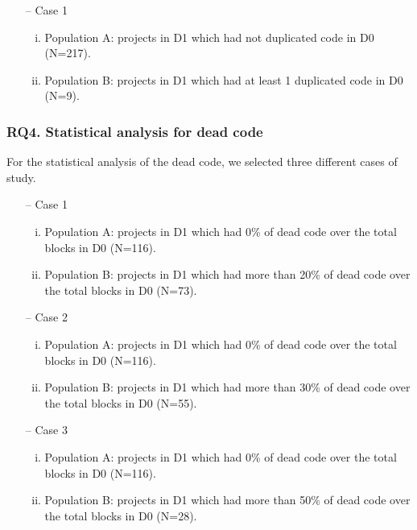 \begin{itemize}
    \item[--] Case 1
    \begin{enumerate}[(i)]
        \item Population A: projects in D1 which had not duplicated code in D0 (N=217).
        \item Population B: projects in D1 which had at least 1 duplicated code in D0 (N=9).
    \end{enumerate}
\end{itemize}

\subsubsection{RQ4. Statistical analysis for dead code}
\label{subsubsec:RQ4_statistical}

For the statistical analysis of the dead code, we selected three different cases of study.

\begin{itemize}
    \item[--] Case 1
    \begin{enumerate}[(i)]
        \item Population A: projects in D1 which had 0\% of dead code over the total blocks in D0 (N=116).
        \item Population B: projects in D1 which had more than 20\% of dead code over the total blocks in D0 (N=73).
    \end{enumerate}
    \item[--] Case 2
    \begin{enumerate}[(i)]
        \item Population A: projects in D1 which had 0\% of dead code over the total blocks in D0 (N=116).
        \item Population B: projects in D1 which had more than 30\% of dead code over the total blocks in D0 (N=55).
    \end{enumerate}
    \item[--] Case 3
    \begin{enumerate}[(i)]
        \item Population A: projects in D1 which had 0\% of dead code over the total blocks in D0 (N=116).
        \item Population B: projects in D1 which had more than 50\% of dead code over the total blocks in D0 (N=28).
    \end{enumerate}
\end{itemize}

